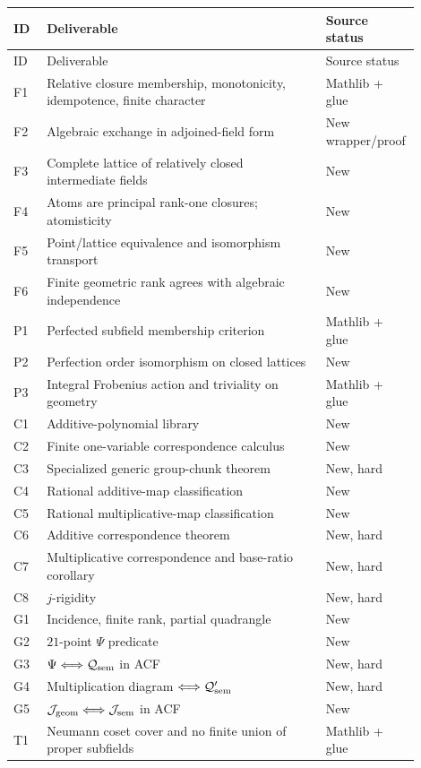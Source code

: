 \documentclass[11pt,oneside]{article}
\theoremstyle{definition}
\theoremstyle{remark}
\newcommand{\Qrel}{\mathcal{Q}}
\newcommand{\Qprel}{\mathcal{Q}'}
\newcommand{\Jrel}{\mathcal{J}}
\begin{document}
\begin{longtable}{p{0.08\linewidth}p{0.67\linewidth}p{0.15\linewidth}}
\toprule
ID & Deliverable & Source status\\
\midrule
\endfirsthead
\toprule
ID & Deliverable & Source status\\
\midrule
\endhead
F1 & Relative closure membership, monotonicity, idempotence, finite character & Mathlib + glue\\
F2 & Algebraic exchange in adjoined-field form & New wrapper/proof\\
F3 & Complete lattice of relatively closed intermediate fields & New\\
F4 & Atoms are principal rank-one closures; atomisticity & New\\
F5 & Point/lattice equivalence and isomorphism transport & New\\
F6 & Finite geometric rank agrees with algebraic independence & New\\
P1 & Perfected subfield membership criterion & Mathlib + glue\\
P2 & Perfection order isomorphism on closed lattices & New\\
P3 & Integral Frobenius action and triviality on geometry & Mathlib + glue\\
C1 & Additive-polynomial library & New\\
C2 & Finite one-variable correspondence calculus & New\\
C3 & Specialized generic group-chunk theorem & New, hard\\
C4 & Rational additive-map classification & New\\
C5 & Rational multiplicative-map classification & New\\
C6 & Additive correspondence theorem & New, hard\\
C7 & Multiplicative correspondence and base-ratio corollary & New, hard\\
C8 & $j$-rigidity & New, hard\\
G1 & Incidence, finite rank, partial quadrangle & New\\
G2 & $21$-point $\Psi$ predicate & New\\
G3 & $\Psi\Longleftrightarrow\Qrel_{\rm sem}$ in ACF & New, hard\\
G4 & Multiplication diagram $\Longleftrightarrow\Qprel_{\rm sem}$ & New, hard\\
G5 & $\Jrel_{\rm geom}\Longleftrightarrow\Jrel_{\rm sem}$ in ACF & New\\
T1 & Neumann coset cover and no finite union of proper subfields & Mathlib + glue\\

\end{longtable}
\end{document}
